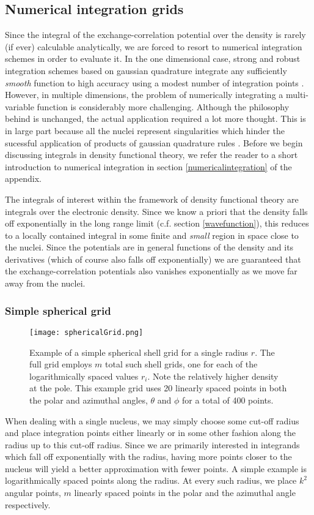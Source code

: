 \documentclass[a4paper]{article}
\newcommand{\comment}[1]{\ignorespaces}
\begin{document}
\subsection{Numerical integration grids}
Since the integral of the exchange-correlation potential over the density is rarely (if ever) calculable analytically, we are forced to resort to numerical integration schemes in order to evaluate it. In the one dimensional case, strong and robust integration schemes based on gaussian quadrature integrate any sufficiently \emph{smooth} function to high accuracy using a modest number of integration points \cite{hjorthjensen}\comment{p116}. However, in multiple dimensions, the problem of numerically integrating a multi-variable function is considerably more challenging. Although the philosophy behind is unchanged, the actual application required a lot more thought. This is in large part because all the nuclei represent singularities which hinder the sucessful application of products of gaussian quadrature rules \cite{voronoi1}. Before we begin discussing integrals in density functional theory, we refer the reader to a short introduction to numerical integration in section \ref{numericalintegration} of the appendix. 

The integrals of interest within the framework of density functional theory are integrals over the electronic density. Since we know a priori that the density falls off exponentially in the long range limit (c.f. section \ref{wavefunction}), this reduces to a locally contained integral in some finite and \emph{small} region in space close to the nuclei. Since the potentials are in general functions of the density and its derivatives (which of course also falls off exponentially) we are guaranteed that the exchange-correlation potentials also vanishes exponentially as we move far away from the nuclei. 

\subsubsection{Simple spherical grid}
\begin{SCfigure}
\centering
\texttt{[image: sphericalGrid.png]}
\caption{Example of a simple spherical shell grid for a single radius $r$. The full grid employs $m$ total such shell grids, one for each of the logarithmically spaced values $r_i$. Note the relatively higher density at the pole. This example grid uses 20 linearly spaced points in both the polar and azimuthal angles, $\theta$ and $\phi$ for a total of 400 points.\label{fig:dft2}}
\end{SCfigure}
When dealing with a single nucleus, we may simply choose some cut-off radius and place integration points either linearly or in some other fashion along the radius up to this cut-off radius. Since we are primarily interested in integrands which fall off exponentially with the radius, having more points closer to the nucleus will yield a better approximation with fewer points. A simple example is logarithmically spaced points along the radius. At every such radius, we place $k^2$ angular points, $m$ linearly spaced points in the polar and the azimuthal angle respectively.
\end{document}
